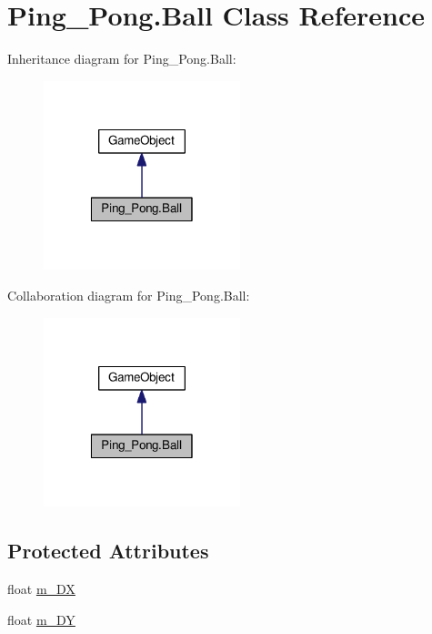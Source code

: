 \hypertarget{class_ping___pong_1_1_ball}{\section{Ping\-\_\-\-Pong.\-Ball Class Reference}
\label{class_ping___pong_1_1_ball}
}


Inheritance diagram for Ping\-\_\-\-Pong.\-Ball\-:\nopagebreak
\begin{figure}[H]
\begin{center}
\leavevmode
\includegraphics[width=162pt]{class_ping___pong_1_1_ball__inherit__graph}
\end{center}
\end{figure}


Collaboration diagram for Ping\-\_\-\-Pong.\-Ball\-:\nopagebreak
\begin{figure}[H]
\begin{center}
\leavevmode
\includegraphics[width=162pt]{class_ping___pong_1_1_ball__coll__graph}
\end{center}
\end{figure}
\subsection*{Protected Attributes}
\begin{DoxyCompactItemize}
\item 
float \hyperlink{class_ping___pong_1_1_ball_abc4e830bbb71be51ce46b48cf2bd7df2}{m\-\_\-\-D\-X}
\item 
float \hyperlink{class_ping___pong_1_1_ball_a9b4627b61b519fd2ed089a277403a356}{m\-\_\-\-D\-Y}
\end{DoxyCompactItemize}

